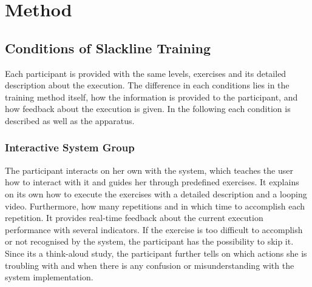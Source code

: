 \section{Method}\label{6_method}

\subsection{Conditions of Slackline Training}
Each participant is provided with the same levels, exercises and its detailed description about the execution.
The difference in each conditions lies in the training method itself, how the information is provided to the participant, and how feedback about the execution is given.
In the following each condition is described as well as the apparatus.

\subsubsection{Interactive System Group}
The participant interacts on her own with the system, which teaches the user how to interact with it and guides her through predefined exercises.
It explains on its own how to execute the exercises with a detailed description and a looping video.
Furthermore, how many repetitions and in which time to accomplish each repetition.
It provides real-time feedback about the current execution performance with several indicators.
If the exercise is too difficult to accomplish or not recognised by the system, the participant has the possibility to skip it.
Since its a think-aloud study, the participant further tells on which actions she is troubling with and when there is any confusion or misunderstanding with the system implementation.

